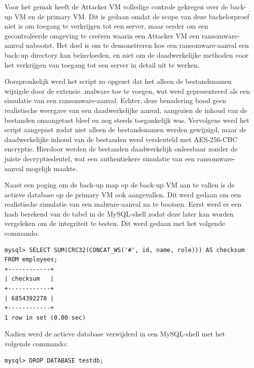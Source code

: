 Voor het gemak heeft de Attacker VM volledige controle gekregen over de back-up VM en de primary VM. Dit is gedaan omdat de scope van deze bachelorproef niet is om toegang te verkrijgen tot een server, maar eerder om een gecontroleerde omgeving te creëren waarin een Attacker VM een ransomware-aanval nabootst. Het doel is om te demonstreren hoe een ransomware-aanval een back-up directory kan beïnvloeden, en niet om de daadwerkelijke methoden voor het verkrijgen van toegang tot een server in detail uit te werken.

Oorspronkelijk werd het script zo opgezet dat het alleen de bestandsnamen wijzigde door de extensie .malware toe te voegen, wat werd gepresenteerd als een simulatie van een ransomware-aanval. Echter, deze benadering bood geen realistische weergave van een daadwerkelijke aanval, aangezien de inhoud van de bestanden onaangetast bleef en nog steeds toegankelijk was. Vervolgens werd het script aangepast zodat niet alleen de bestandsnamen werden gewijzigd, maar de daadwerkelijke inhoud van de bestanden werd versleuteld met AES-256-CBC encryptie. Hierdoor werden de bestanden daadwerkelijk onleesbaar zonder de juiste decryptiesleutel, wat een authentiekere simulatie van een ransomware-aanval mogelijk maakte.

Naast een poging om de back-up map op de back-up VM aan te vallen is de actieve database op de primary VM ook aangevallen. Dit werd gedaan om een realistische simulatie van een malware-aanval na te bootsen. Eerst werd er een hash berekend van de tabel in de MySQL-shell zodat deze later kan worden vergeleken om de integriteit te testen. Dit werd gedaan met het volgende commando:
\begin{lstlisting}[language=code, caption={MySQL commando om de hash van de tabel te berekenen voor de restore.}]
mysql> SELECT SUM(CRC32(CONCAT_WS('#', id, name, role))) AS checksum FROM employees;
+------------+
| checksum   |
+------------+
| 6854392278 |
+------------+
1 row in set (0.00 sec)
\end{lstlisting}
Nadien werd de actieve database verwijderd in een MySQL-shell met het volgende commando:
\begin{lstlisting}[language=code, caption={Commando om de actieve MySQL database te droppen.}]
mysql> DROP DATABASE testdb;
\end{lstlisting}

